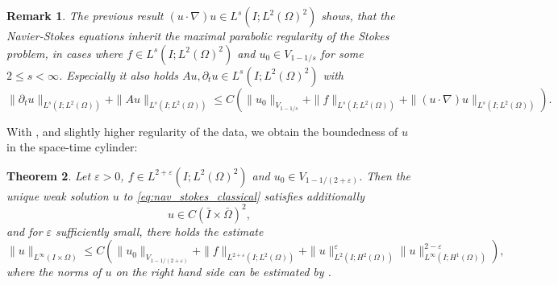 \documentclass{m2an}
\newtheorem{theorem}{Theorem}[section]
\newtheorem{remark}[theorem]{Remark}
\newcommand{\LinfHone}{L^\infty(I;H^1(\Omega))}
\newcommand{\LtwoHtwo}{L^2(I;H^2(\Omega))}
\begin{document}
\begin{remark}
  The previous result $(u\cdot \nabla)u \in L^s(I;L^2(\Omega)^2)$ shows, that 
  the Navier-Stokes equations inherit the maximal parabolic regularity of the 
  Stokes problem, in cases where $f \in L^s(I;L^2(\Omega)^2)$ and $u_0 \in V_{1- 1/s}$ for some
  $2 \le s < \infty$. Especially it also holds $Au, \partial_t u \in L^s(I;L^2(\Omega)^2)$ with
  \begin{equation*}
    \|\partial_t u\|_{L^s(I;L^2(\Omega))} + \|Au\|_{L^s(I;L^2(\Omega))} 
    \le C \left(\|u_0\|_{V_{1-1/s}} 
    + \|f\|_{L^s(I;L^2(\Omega))} + \|(u \cdot \nabla) u\|_{L^s(I;L^2(\Omega))}\right).
  \end{equation*}
\end{remark}
With , and slightly higher regularity
of the data, we obtain the boundedness of $u$ in the space-time cylinder:
\begin{theorem}\label{thm:navier_stokes_higher_regularity}
  Let $\varepsilon > 0$, $f \in L^{2+\varepsilon}(I;L^2(\Omega)^2)$ and 
  $u_0 \in V_{1-1/(2+\varepsilon)}$.
  Then the unique weak solution $u$ to 
  \eqref{eq:nav_stokes_classical} satisfies additionally
  \begin{equation*}
    u \in C(\bar I \times \bar \Omega)^2,
  \end{equation*}
  and for $\varepsilon$ sufficiently small, there holds the estimate
  \begin{equation*}
    \|u\|_{L^\infty(I \times \Omega)}
    \le C \left(\|u_0\|_{V_{1-1/(2+\varepsilon)}} + \|f\|_{L^{2+\varepsilon}(I;L^2(\Omega))} 
    + \|u\|_{\LtwoHtwo}^{\varepsilon} \|u\|_{\LinfHone}^{2 -\varepsilon}\right),
  \end{equation*}
  where the norms of $u$ on the right hand side can be estimated by .
\end{theorem}
\end{document}
